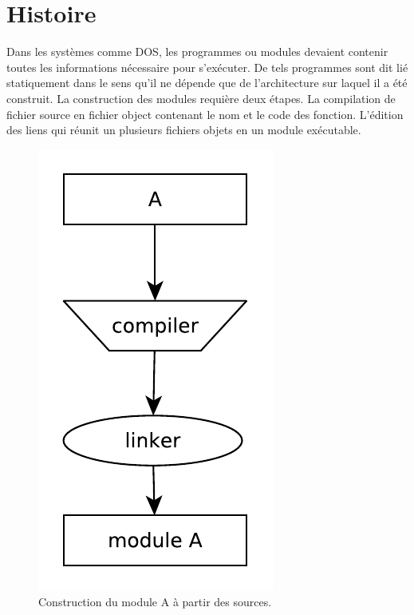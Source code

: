 
\chapter[]{Histoire}%

Dans les systèmes comme DOS, les programmes ou modules devaient contenir toutes les
informations nécessaire pour s'exécuter. De tels programmes sont dit lié
statiquement dans le sens qu'il ne dépende que de l'architecture sur laquel il
a été construit. La construction des modules requière deux étapes. La compilation
de fichier source en fichier object contenant le nom et le code des fonction.
L'édition des liens qui réunit un plusieurs fichiers objets en un module exécutable.

\begin{figure}[ht]
  \includegraphics[width=0.20\linewidth]{figures/basic_module_compilation.pdf}
  \caption{Construction du module A à partir des sources.}
\end{figure}

%
%

